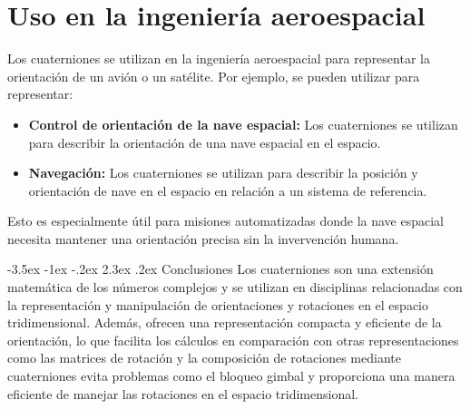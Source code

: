 \documentclass[11pt]{report}
\makeatletter
\renewcommand\chapter{\@startsection{chapter}{0}{\z@}%
    {-3.5ex \@plus -1ex \@minus -.2ex}%
    {2.3ex \@plus.2ex}%
    {\normalfont\Large\bfseries}}
\makeatother
\begin{document}
\section{Uso en la ingeniería aeroespacial}
Los cuaterniones se utilizan en la ingeniería aeroespacial para representar la orientación de un avión o un satélite. Por ejemplo, se pueden utilizar para representar:
\begin{itemize}
  \item \textbf{Control de orientación de la nave espacial: } Los cuaterniones se utilizan para describir la orientación de una nave espacial en el espacio. 
  \item \textbf{Navegación: } Los cuaterniones se utilizan para describir la posición y orientación de nave en el espacio en relación a un sistema de referencia.
\end{itemize}

Esto es especialmente útil para misiones automatizadas donde la nave espacial necesita mantener una orientación precisa sin la invervención humana.

\newpage

\chapter{Conclusiones}
Los cuaterniones son una extensión matemática de los números complejos y se utilizan en disciplinas relacionadas con la representación y manipulación de orientaciones y rotaciones en el espacio tridimensional.
Además, ofrecen una representación compacta y eficiente de la orientación, lo que facilita los cálculos en comparación con otras representaciones como las matrices de rotación y la composición de rotaciones 
mediante cuaterniones evita problemas como el bloqueo gimbal y proporciona una manera eficiente de manejar las rotaciones en el espacio tridimensional.
\end{document}
